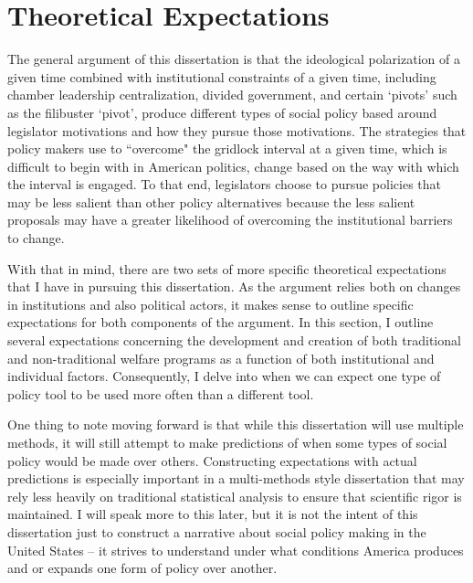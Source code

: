 \documentclass[12pt]{article}
\begin{document}
\section{Theoretical Expectations}
The general argument of this dissertation is that the ideological polarization of a given time combined with institutional constraints of a given time, including chamber leadership centralization, divided government, and certain `pivots' such as the filibuster `pivot', produce different types of social policy based around legislator motivations and how they pursue those motivations. The strategies that policy makers use to ``overcome" the gridlock interval at a given time, which is difficult to begin with in American politics, change based on the way with which the interval is engaged. To that end, legislators choose to pursue policies that may be less salient than other policy alternatives because the less salient proposals may have a greater likelihood of overcoming the institutional barriers to change.

With that in mind, there are two sets of more specific theoretical expectations that I have in pursuing this dissertation. As the argument relies both on changes in institutions and also political actors, it makes sense to outline specific expectations for both components of the argument. In this section, I outline several expectations concerning the development and creation of both traditional and non-traditional welfare programs as a function of both institutional and individual factors. Consequently, I delve into when we can expect one type of policy tool to be used more often than a different tool.

One thing to note moving forward is that while this dissertation will use multiple methods, it will still attempt to make predictions of when some types of social policy would be made over others. Constructing expectations with actual predictions is especially important in a multi-methods style dissertation that may rely less heavily on traditional statistical analysis to ensure that scientific rigor is maintained. I will speak more to this later, but it is not the intent of this dissertation just to construct a narrative about social policy making in the United States -- it strives to understand under what conditions America produces and or expands one form of policy over another.
\end{document}
